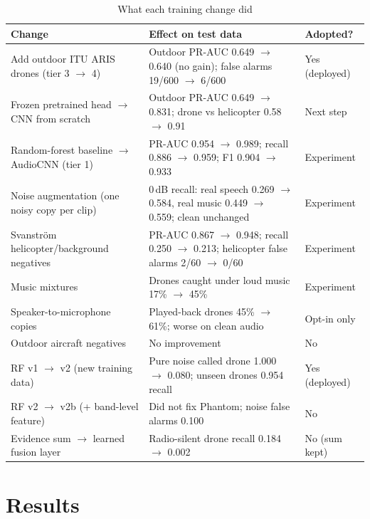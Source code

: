 \documentclass[conference,a4paper]{IEEEtran}
\begin{document}
\begin{table}[!t]
\centering\footnotesize
\caption{What each training change did}
\label{tab:variants}
\begin{tabularx}{\textwidth}{@{}L{5.2cm} Y L{2.6cm}@{}}
\toprule
Change & Effect on test data & Adopted? \\
\midrule
Add outdoor ITU ARIS drones (tier 3 $\rightarrow$ 4) & Outdoor PR-AUC 0.649 $\rightarrow$ 0.640 (no gain); false alarms 19/600 $\rightarrow$ 6/600 & Yes (deployed) \\
Frozen pretrained head $\rightarrow$ CNN from scratch & Outdoor PR-AUC 0.649 $\rightarrow$ 0.831; drone vs helicopter 0.58 $\rightarrow$ 0.91 & Next step \\
Random-forest baseline $\rightarrow$ AudioCNN (tier 1) & PR-AUC 0.954 $\rightarrow$ 0.989; recall 0.886 $\rightarrow$ 0.959; F1 0.904 $\rightarrow$ 0.933 & Experiment \\
Noise augmentation (one noisy copy per clip) & 0\,dB recall: real speech 0.269 $\rightarrow$ 0.584, real music 0.449 $\rightarrow$ 0.559; clean unchanged & Experiment \\
Svanstr\"om helicopter/background negatives & PR-AUC 0.867 $\rightarrow$ 0.948; recall 0.250 $\rightarrow$ 0.213; helicopter false alarms 2/60 $\rightarrow$ 0/60 & Experiment \\
Music mixtures & Drones caught under loud music 17\% $\rightarrow$ 45\% & Experiment \\
Speaker-to-microphone copies & Played-back drones 45\% $\rightarrow$ 61\%; worse on clean audio & Opt-in only \\
Outdoor aircraft negatives & No improvement & No \\
RF v1 $\rightarrow$ v2 (new training data) & Pure noise called drone 1.000 $\rightarrow$ 0.080; unseen drones 0.954 recall & Yes (deployed) \\
RF v2 $\rightarrow$ v2b (+ band-level feature) & Did not fix Phantom; noise false alarms 0.100 & No \\
Evidence sum $\rightarrow$ learned fusion layer & Radio-silent drone recall 0.184 $\rightarrow$ 0.002 & No (sum kept) \\
\bottomrule
\end{tabularx}
\end{table}

\section{Results}
\end{document}
